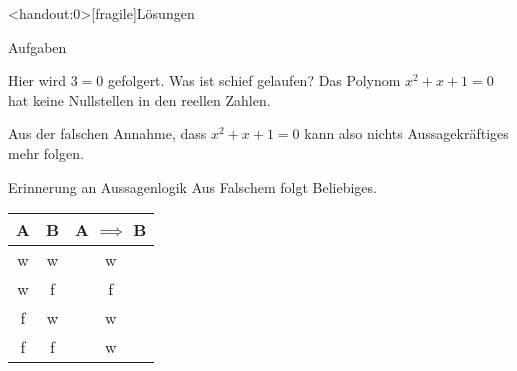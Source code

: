 {
	\begin{frame}<handout:0>[fragile]{Lösungen}
		\begin{alertblock}{Aufgaben}
		\small{
			\begin{block}{Hier wird $3=0$ gefolgert. Was ist schief gelaufen?}
				Das Polynom $x^2 + x + 1 = 0$ hat keine Nullstellen in den reellen Zahlen.
				
				Aus der falschen Annahme, dass $x^2 + x + 1 = 0$ kann also nichts Aussagekräftiges mehr folgen.
			\end{block}
			\begin{alertblock}{Erinnerung an Aussagenlogik}
				Aus Falschem folgt Beliebiges.\\
				\begin{table}
					\begin{tabular}{ccc}
						\toprule
						A & B & A $\implies$ B \\
						\midrule
						w & w & w \\
						w & f & f \\
						\alert{f} & \alert{w} & \alert{w} \\
						\alert{f} & \alert{f} & \alert{w} \\
						\bottomrule
					\end{tabular}
				\end{table}
			\end{alertblock}
		}
		\end{alertblock}
	\end{frame}
}